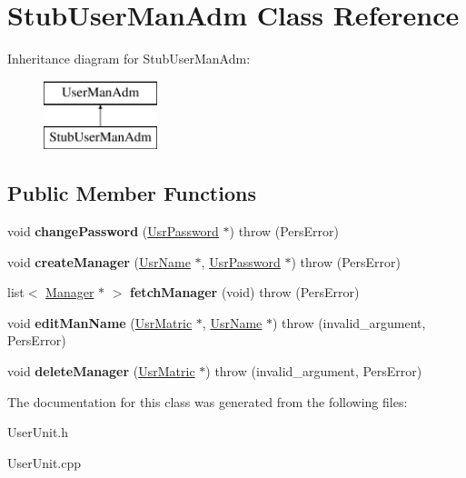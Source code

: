 \hypertarget{classStubUserManAdm}{\section{Stub\-User\-Man\-Adm Class Reference}
\label{dd/dfd/classStubUserManAdm}
}
Inheritance diagram for Stub\-User\-Man\-Adm\-:\begin{figure}[H]
\begin{center}
\leavevmode
\includegraphics[height=2.000000cm]{dd/dfd/classStubUserManAdm}
\end{center}
\end{figure}
\subsection*{Public Member Functions}
\begin{DoxyCompactItemize}
\item 
\hypertarget{classStubUserManAdm_a63130507e95ab092b0bf09704b13b6ec}{void {\bfseries change\-Password} (\hyperlink{classUsrPassword}{Usr\-Password} $\ast$)  throw (\-Pers\-Error)}\label{dd/dfd/classStubUserManAdm_a63130507e95ab092b0bf09704b13b6ec}

\item 
\hypertarget{classStubUserManAdm_ac833e3729b1adf46edf78376719acde5}{void {\bfseries create\-Manager} (\hyperlink{classUsrName}{Usr\-Name} $\ast$, \hyperlink{classUsrPassword}{Usr\-Password} $\ast$)  throw (\-Pers\-Error)}\label{dd/dfd/classStubUserManAdm_ac833e3729b1adf46edf78376719acde5}

\item 
\hypertarget{classStubUserManAdm_a1d8b9e3691aef8438bf0b125efb54972}{list$<$ \hyperlink{classManager}{Manager} $\ast$ $>$ {\bfseries fetch\-Manager} (void)  throw (\-Pers\-Error)}\label{dd/dfd/classStubUserManAdm_a1d8b9e3691aef8438bf0b125efb54972}

\item 
\hypertarget{classStubUserManAdm_ac1da713638e441434c8ec426be495a0b}{void {\bfseries edit\-Man\-Name} (\hyperlink{classUsrMatric}{Usr\-Matric} $\ast$, \hyperlink{classUsrName}{Usr\-Name} $\ast$)  throw (invalid\-\_\-argument, Pers\-Error)}\label{dd/dfd/classStubUserManAdm_ac1da713638e441434c8ec426be495a0b}

\item 
\hypertarget{classStubUserManAdm_a45f93196f3de7a92ebd0688007b47e5f}{void {\bfseries delete\-Manager} (\hyperlink{classUsrMatric}{Usr\-Matric} $\ast$)  throw (invalid\-\_\-argument, Pers\-Error)}\label{dd/dfd/classStubUserManAdm_a45f93196f3de7a92ebd0688007b47e5f}

\end{DoxyCompactItemize}


The documentation for this class was generated from the following files\-:\begin{DoxyCompactItemize}
\item 
User\-Unit.\-h\item 
User\-Unit.\-cpp\end{DoxyCompactItemize}
